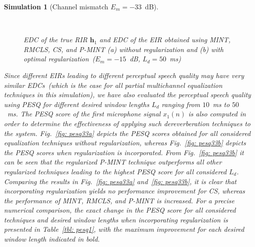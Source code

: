 \documentclass[10pt]{IEEEtran}
\newtheorem{simulation}{Simulation}
\begin{document}
\begin{simulation}[Channel mismatch $E_m=-33$~dB]
\begin{figure}[t!]
\centering
\hbox{
}
\caption{EDC of the true RIR $\mathbf{h}_1$ and EDC of the EIR obtained using MINT, RMCLS, CS, and P-MINT (a) without regularization and (b) with optimal regularization~($E_m = -15$~dB, $L_d = 50$~ms)}
\end{figure}
Since different EIRs leading to different perceptual speech quality may have very similar EDCs~(which is the case for all partial multichannel equalization techniques in this simulation), we have also evaluated the perceptual speech quality using PESQ for different desired window lengths $L_d$ ranging from $10$~ms to $50$~ms.
The PESQ score of the first microphone signal $x_1(n)$ is also computed in order to determine the effectiveness of applying such dereverberation techniques to the system.
Fig.~\ref{fig: pesq33a} depicts the PESQ scores obtained for all considered equalization techniques without regularization, whereas Fig.~\ref{fig: pesq33b} depicts the PESQ scores when regularization is incorporated.
From Fig.~\ref{fig: pesq33b} it can be seen that the regularized P-MINT technique outperforms all other regularized techniques leading to the highest PESQ score for all considered $L_d$.
Comparing the results in Fig.~\ref{fig: pesq33a} and~\ref{fig: pesq33b}, it is clear that incorporating regularization yields no performance improvement for CS, whereas the performance of MINT, RMCLS, and P-MINT is increased.
For a precise numerical comparison, the exact change in the PESQ score for all considered techniques and desired window lengths when incorporating regularization is presented in Table~\ref{tbl: pesq1}, with the maximum improvement for each desired window length indicated in bold.

\end{simulation}
\end{document}
